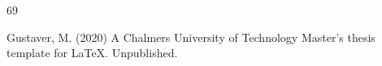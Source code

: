 \begin{thebibliography}{69}

     Gustaver, M. (2020) A Chalmers University of Technology Master's thesis template for \LaTeX . Unpublished.
    
    \end{thebibliography}
    